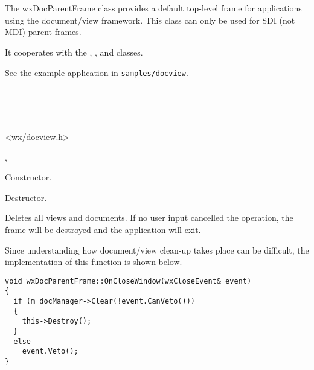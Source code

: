 \section{}\label{wxdocparentframe}

The wxDocParentFrame class provides a default top-level frame for
applications using the document/view framework. This class can only be used for SDI (not MDI) parent frames.

It cooperates with the , ,
\rtfsp{} and  classes.

See the example application in {\tt samples/docview}.


\\
\\
\\


<wx/docview.h>


, 


\label{wxdocparentframector}


Constructor.

\label{wxdocparentframedtor}


Destructor.

\label{wxdocparentframeonclosewindow}


Deletes all views and documents. If no user input cancelled the
operation, the frame will be destroyed and the application will exit.

Since understanding how document/view clean-up takes place can be difficult,
the implementation of this function is shown below.

\begin{verbatim}
void wxDocParentFrame::OnCloseWindow(wxCloseEvent& event)
{
  if (m_docManager->Clear(!event.CanVeto()))
  {
    this->Destroy();
  }
  else
    event.Veto();
}
\end{verbatim}

